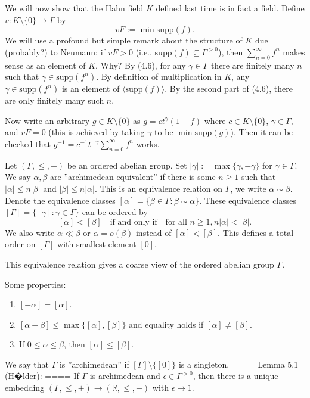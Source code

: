 
We will now show that the Hahn field $K$ defined last time is in fact a field. Define $v:K\setminus \{0\}\rightarrow \Gamma$ by $$vF:=\min \mathrm{supp}(f).$$ We will use a profound but simple remark about the structure of $K$ due (probably?) to Neumann: if $vF>0$ (i.e., $\mathrm{supp}(f)\subseteq \Gamma^{>0}$), then $\sum_{n=0}^\infty f^n$ makes sense as an element of $K$. Why? By (4.6), for any $\gamma\in \Gamma$ there are finitely many $n$ such that $\gamma\in\mathrm{supp}(f^n)$. By definition of multiplication in $K$, any $\gamma\in \mathrm{supp}(f^n)$ is an element of $\langle \mathrm{supp}(f)\rangle$. By the second part of (4.6), there are only finitely many such $n$.

Now write an arbitrary $g\in K\setminus \{0\}$ as $g=ct^\gamma(1-f)$ where $c\in K\setminus \{0\}$, $\gamma\in \Gamma$, and $vF=0$ (this is achieved by taking $\gamma$ to be $\min\mathrm{supp}(g)$). Then it can be checked that $g^{-1}=c^{-1}t^{-\gamma}\sum_{n=0}^\infty f^n$ works.

Let $(\Gamma, \le, +)$ be an ordered abelian group. Set $|\gamma|:=\max\{\gamma, -\gamma\}$ for $\gamma\in \Gamma$. We say $\alpha,\beta$ are ''archimedean equivalent'' if there is some $n\ge 1$ such that $|\alpha|\le n|\beta|$ and $|\beta|\le n|\alpha|$. This is an equivalence relation on $\Gamma$, we write $\alpha\sim\beta$. Denote the equivalence classes $[\alpha]=\{\beta\in\Gamma:\beta\sim\alpha\}$. These equivalence classes $[\Gamma]=\{[\gamma]:\gamma\in\Gamma\}$ can be ordered by 
$$[\alpha]<[\beta]\quad \textrm{if and only if} \quad \textrm{for all }n\ge 1, n|\alpha|<|\beta|.$$
We also write $\alpha\ll\beta$ or $\alpha=o(\beta)$ instead of $[\alpha]<[\beta]$. This defines a total order on $[\Gamma]$ with smallest element $[0]$.

This equivalence relation gives a coarse view of the ordered abelian group $\Gamma$.

Some properties:
\begin{enumerate}
  \item  $[-\alpha]=[\alpha]$.
  \item  $[\alpha+\beta]\le \max\{[\alpha],[\beta]\}$ and equality holds if $[\alpha]\neq [\beta]$.
  \item  If $0\le \alpha\le \beta$, then $[\alpha]\le [\beta]$.
\end{enumerate}


We say that $\Gamma$ is ''archimedean'' if $[\Gamma]\setminus \{[0]\}$ is a singleton.
====Lemma 5.1 (H�lder): ====
If $\Gamma$ is archimedean and $\epsilon\in \Gamma^{>0}$, then there is a unique embedding $(\Gamma,\le,+)\rightarrow (\mathbb{R},\le,+)$ with $\epsilon\mapsto 1$.

